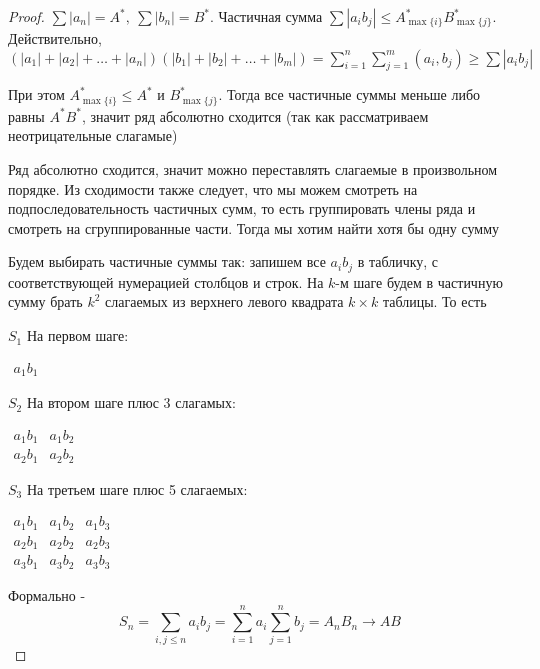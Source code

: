 \begin{proof}
    $\sum |a_n| = A^*,\ \sum|b_n| = B^*$. Частичная сумма $\sum |a_i b_j| \leq A^*_{\max\{i\}}B^*_{\max\{j\}}$. Действительно, 
    $(|a_1| + |a_2| + \ldots + |a_n|)(|b_1| + |b_2|+\ldots + |b_m|) = \sum \limits_{i=1}^n \sum \limits_{j=1}^m (a_i, b_j) \geq \sum|a_i b_j|$
    
    При этом $A^*_{\max\{i\}} \leq A^*$ и $B^*_{\max\{j\}}$. Тогда все частичные суммы 
    меньше либо равны $A^*B^*$, значит ряд абсолютно сходится (так как рассматриваем неотрицательные слагамые)

    Ряд абсолютно сходится, значит можно переставлять слагаемые в произвольном порядке.
    Из сходимости также следует, что мы можем смотреть на подпоследовательность частичных сумм, то есть группировать
    члены ряда и смотреть на сгруппированные части. Тогда мы хотим найти хотя бы одну сумму

    Будем выбирать частичные суммы так: запишем все $a_ib_j$ в табличку,
    с соответствующей нумерацией столбцов и строк. На $k$-м шаге
    будем в частичную сумму брать $k^2$ слагаемых из верхнего
    левого квадрата $k\times k$ таблицы. То есть
      
    $S_1$ На первом шаге:

    $\begin{matrix}
        a_1b_1
    \end{matrix}$

    $S_2$ На втором шаге плюс 3 слагамых:

    $\begin{matrix}
        a_1b_1 & a_1b_2 \\
        a_2b_1 & a_2b_2
    \end{matrix}$

    $S_3$ На третьем шаге плюс 5 слагаемых:

    $\begin{matrix}
        a_1b_1 & a_1b_2 & a_1b_3 \\
        a_2b_1 & a_2b_2 & a_2b_3 \\
        a_3b_1 & a_3b_2 & a_3b_3
    \end{matrix}$

    Формально -
    \begin{equation*}
        S_n = \sum_{i,j \leq n} a_ib_j = \sum_{i=1}^n a_i \sum_{j=1}^n b_j
        = A_nB_n \to AB
    \end{equation*}

\end{proof}

